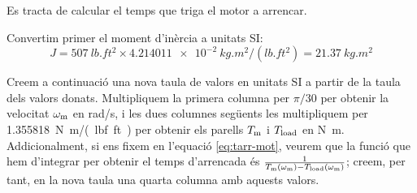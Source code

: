 \begin{exemple}
 Es tracta de calcular el temps que triga el motor a arrencar.

Convertim primer el moment d'inèrcia a unitats SI:
\[
    J =  \qty{507}{lb.ft^2} \times \qty{4,214011e-2}{kg.m^2/(lb.ft^2)}
    = \qty{21,37}{kg.m^2}
\]

Creem a continuació una nova taula de valors en unitats SI a partir de la taula dels valors donats. Multipliquem la primera columna per $\pi/30$ per obtenir la velocitat $\omega_\mathrm{m}$ en \unit{rad/s}, i les dues columnes següents les multipliquem per \qty{1,355818}{N.m/(lbf.ft)} per obtenir els parells $T_\mathrm{m}$ i $T_\mathrm{load}$ en \unit{N.m}. Addicionalment, si ens fixem en l'equació \eqref{eq:tarr-mot}, veurem que la funció que hem d'integrar per obtenir el temps d'arrencada és $\frac{1}{T_\mathrm{m}(\omega_\mathrm{m})-T_\mathrm{load}(\omega_\mathrm{m})}$; creem, per tant, en la nova taula una quarta columna amb aquests valors.


\end{exemple}

